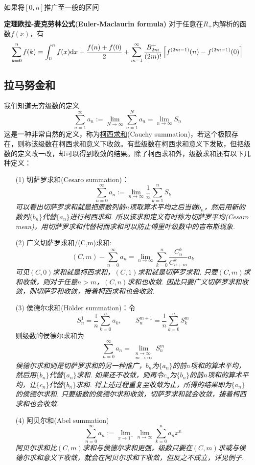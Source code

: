 \documentclass[UTF8]{ctexart}
\newcommand{\trm}[1]{{\rm #1}}
\newenvironment{theorem}[1]
    {\begin{tcolorbox}[enhanced, colback=LightYellow, breakable=true, frame hidden, borderline west={1.5mm}{-2mm}{DarkBlue}]
    {\bfseries {\color{DarkBlue} 定理}\quad #1} \newline}
    {\end{tcolorbox}}
\begin{document}
如果将\([0,n]\)推广至一般的区间
\begin{theorem}{欧拉-麦克劳林公式(Euler-Maclaurin formula)}
    对于任意在\(R_+\)内解析的函数\(f(x)\)，有
    \[\sum_{k=0}^{n}f(k) = \int_0^nf(x)\trm{d}x + \frac{f(n)+f(0)}{2} + \sum_{m=1}^{\infty}\frac{B_{2m}^+}{(2m)!}\left[f^{(2m-1)}(n) - f^{(2m-1)}(0)\right]\]
\end{theorem}

\subsection{拉马努金和}

我们知道无穷级数的定义
\[ \sum_{n=1}^{\infty}a_n := \lim_{N \to \infty}\sum_{n=1}^{N}a_n = \lim_{n \to \infty}S_n\]
这是一种非常自然的定义，称为\uline{柯西求和}(Cauchy summation)，若这个极限存在，则称该级数在柯西求和意义下收敛。有些级数在柯西求和意义下发散，但把级数的定义改一改，却可以得到收敛的结果。除了柯西求和外，级数求和还有以下几种定义：
\begin{itemize}
    \item[(1)] 切萨罗求和(Cesaro summation)：
    \[ \sum_{n=0}^{\infty}a_n := \lim_{n \to \infty} \frac{1}{n}\sum_{k=1}^{n}S_k\]
    \textit{
        可以看出切萨罗求和就是把原数列前\(n\)项取算术平均之后当做\(b_n\)，然后用新的数列\(\{b_n\}\)代替\(\{a_n\}\)进行柯西求和. 所以该求和定义有时称为\uline{切萨罗平均}(Cesaro mean)，用切萨罗求和代替柯西求和可以防止傅里叶级数中的吉布斯现象.
    }
    \item[(2)] 广义切萨罗求和/(C,m)求和:
    \[ (C,m) - \sum_{n=0}^{\infty}a_n = \lim_{n \to \infty}\sum_{k=0}^{n}\frac{C_n^k}{C_{n+m}^k}a_k\]
    \textit{
        可见\((C,0)\)求和就是柯西求和，\((C,1)\)求和就是切萨罗求和. 只要\((C,m)\)求和收敛，则对于任意\(n>m\)，\((C,n)\)求和也收敛. 因此只要广义切萨罗求和收敛，则切萨罗和收敛，接着柯西求和也会收敛.
    }
    \item[(3)] 侯德尔求和(Hölder summation)：令
    \[S_n^1 = \frac{1}{n}\sum_{k=0}^{n}a_k, \qquad S_n^{m+1} = \frac{1}{n}\sum_{k=0}^{n}S_{k}^{m}\] 
    则级数的侯德尔求和为
    \[\sum_{n=0}^{\infty}a_n = \lim_{\substack{n \to \infty \\ m \to \infty}}S_{n}^{m}\]
    \textit{
        侯德尔求和则是切萨罗求和的另一种推广，\(b_n\)为\(\{a_n\}\)的前\(n\)项和的算术平均，然后用\(\{b_n\}\)代替\(\{a_n\}\)求和. 如果还不收敛，则再令\(c_n\)为\(\{b_n\}\)的前\(n\)项和的算术平均，让\(\{c_n\}\)代替\(\{b_n\}\)求和. 将上述过程重复至收敛为止，所得的结果即为\(\{a_n\}\)的侯德尔求和. 只要级数的侯德尔求和收敛，切萨罗求和就会收敛，接着柯西求和也会收敛.
    }
    \item[(4)] 阿贝尔和(Abel summation)
    \[ \sum_{n=0}^{\infty}a_n := \lim_{x \to 1^-}\lim_{n \to \infty}\sum_{k=0}^{n}a_nx^n\]
    \textit{
        阿贝尔求和比\((C,m)\)求和与侯德尔求和更强，级数只要在\((C,m)\)求或与侯德尔求和意义下收敛，就会在阿贝尔求和下收敛，但反之不成立，详见例子.
    }
\end{itemize}
\end{document}
